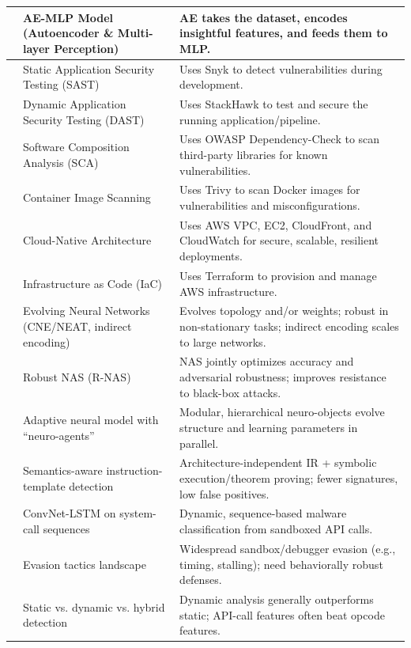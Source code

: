 \begin{longtable}{|M{2cm}|M{3.5cm}|M{7cm}|}
\textcite{Modalavalasa} & AE-MLP Model (Autoencoder \& Multi-layer Perception) & AE takes the dataset, encodes insightful features, and feeds them to MLP. \\\hline
\textcite{Marandi} & Static Application Security Testing (SAST) & Uses Snyk to detect vulnerabilities during development. \\\hline
\textcite{Marandi} & Dynamic Application Security Testing (DAST) & Uses StackHawk to test and secure the running application/pipeline. \\\hline
\textcite{Ashtagi} & Software Composition Analysis (SCA) & Uses OWASP Dependency-Check to scan third-party libraries for known vulnerabilities. \\\hline
\textcite{Ashtagi}  & Container Image Scanning & Uses Trivy to scan Docker images for vulnerabilities and misconfigurations. \\\hline
\textcite{Ashtagi}  & Cloud-Native Architecture & Uses AWS VPC, EC2, CloudFront, and CloudWatch for secure, scalable, resilient deployments. \\\hline
\textcite{Ashtagi}  \textcite{Ganugapati} & Infrastructure as Code (IaC) & Uses Terraform to provision and manage AWS infrastructure. \\\hline
\textcite{Miikkulainen} \textcite{Harvey} & Evolving Neural Networks (CNE/NEAT, indirect encoding) & Evolves topology and/or weights; robust in non-stationary tasks; indirect encoding scales to large networks. \\\hline
\textcite{Kotyan} & Robust NAS (R-NAS) & NAS jointly optimizes accuracy and adversarial robustness; improves resistance to black-box attacks. \\\hline
\textcite{Tsukamoto} & Adaptive neural model with ``neuro-agents'' & Modular, hierarchical neuro-objects evolve structure and learning parameters in parallel. \\\hline
\textcite{Christodorescu} & Semantics-aware instruction-template detection & Architecture-independent IR + symbolic execution/theorem proving; fewer signatures, low false positives. \\\hline
\textcite{Kolosnjaji} & ConvNet-LSTM on system-call sequences & Dynamic, sequence-based malware classification from sandboxed API calls. \\\hline
\textcite{Galloro} & Evasion tactics landscape & Widespread sandbox/debugger evasion (e.g., timing, stalling); need behaviorally robust defenses. \\\hline
\textcite{Damodaran} & Static vs. dynamic vs. hybrid detection & Dynamic analysis generally outperforms static; API-call features often beat opcode features. \\\hline

\end{longtable}
